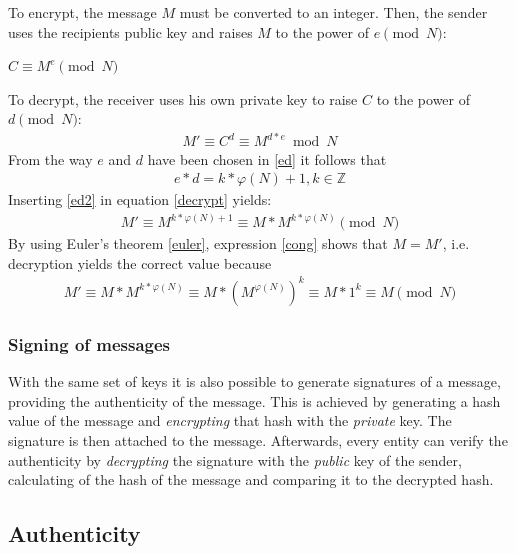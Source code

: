 To encrypt, the message $M$ must be converted to an integer. Then, the sender uses the recipients public key and raises $M$ to the power of $e \pmod N$:
\begin{center}
 $C \equiv M^e \pmod N$
\end{center}
To decrypt, the receiver uses his own private key to raise $C$ to the power of $d \pmod N$:
\begin{align}\label{decrypt}
 M' \equiv C^d \equiv M^{d*e} \bmod N
\end{align}
From the way $e$ and $d$ have been chosen in \ref{ed} it follows that 
\begin{align}\label{ed2}
 e*d = k * \varphi(N) + 1, k \in \mathbb{Z} 
\end{align}
Inserting \ref{ed2} in equation \ref{decrypt} yields:
\begin{align}\label{cong}
  M' \equiv M^{k * \varphi(N) + 1} \equiv M* M^{k * \varphi(N)} \pmod N
\end{align}
By using Euler's theorem \ref{euler}, expression \ref{cong} shows that $M=M'$, i.e. decryption yields the correct value because
\begin{align*}
 M' \equiv M* M^{k * \varphi(N)} \equiv M* (M^{ \varphi(N)})^k \equiv M * 1^k \equiv M \pmod N
\end{align*} 

\subsubsection{Signing of messages}

With the same set of keys it is also possible to generate signatures of a message, providing the authenticity of the message.
This is achieved by generating a hash value of the message and \textit{encrypting} that hash with the \textit{private} key. The signature is then attached to the
message. Afterwards, every entity can verify the authenticity by \textit{decrypting} the signature with the \textit{public} key of the sender, calculating of
the hash of the message and comparing it to the decrypted hash.


\subsection{Authenticity}\label{authenticity}

